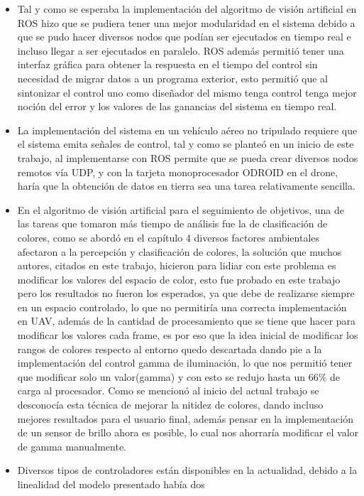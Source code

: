 \begin{itemize}
    \item Tal y como se esperaba la implementación del algoritmo de visión artificial en ROS hizo que se pudiera tener una mejor modularidad
    en el sistema debido a que se pudo hacer diversos nodos que podían ser ejecutados en tiempo real e incluso llegar a ser
    ejecutados en paralelo. ROS además permitió tener una interfaz gráfica para obtener la respuesta en el tiempo del control sin necesidad
    de migrar datos a un programa exterior, esto permitió que al sintonizar el control uno como diseñador del mismo tenga control tenga
    mejor noción del error y los valores de las ganancias del sistema en tiempo real.
    \item La implementación del sistema en un vehículo aéreo no tripulado requiere que el sistema emita señales de control, tal y como
    se planteó en un inicio de este trabajo, al implementarse con ROS permite que se pueda crear diversos nodos remotos vía UDP, y con
    la tarjeta monoprocesador ODROID en el drone, haría que la obtención de datos en tierra sea una tarea relativamente sencilla.
    \item En el algoritmo de visión artificial para el seguimiento de objetivos, una de las tareas que tomaron más tiempo de análisis
    fue la de clasificación de colores, como se abordó en el capítulo 4 diversos factores ambientales afectaron a la percepción y
    clasificación de colores, la solución que muchos autores, citados en este trabajo, hicieron para lidiar con este problema es modificar
    los valores del espacio de color, esto fue probado en este trabajo pero los resultados no fueron los esperados, ya que debe de realizarse
    siempre en un espacio controlado, lo que no permitiría una correcta implementación en UAV, además de la cantidad de procesamiento
    que se tiene que hacer para modificar los valores cada frame, es por eso que la idea inicial de modificar los rangos de colores respecto
    al entorno quedo descartada dando pie a la implementación del control gamma de iluminación, lo que nos permitió tener que modificar
    solo un valor(gamma) y con esto se redujo hasta un 66\% de carga al procesador. Como se mencionó al inicio del actual trabajo se desconocía
    esta técnica de mejorar la nitidez de colores, dando incluso mejores resultados para el usuario final, además pensar en la implementación
    de un sensor de brillo ahora es posible, lo cual nos ahorraría modificar el valor de gamma manualmente.
    \item Diversos tipos de controladores están disponibles en la actualidad, debido a la linealidad del modelo presentado había dos

\end{itemize}
